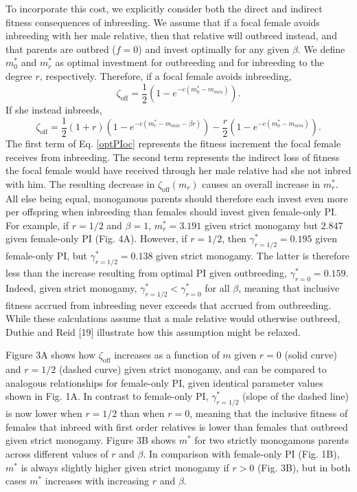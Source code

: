 \documentclass[12pt]{article}
\begin{document}
To incorporate this cost, we explicitly consider both the direct and indirect fitness consequences of inbreeding. We assume that if a focal female avoids inbreeding with her male relative, then that relative will outbreed instead, and that parents are outbred ($f=0$) and invest optimally for any given $\beta$. We define $m^{*}_{0}$ and $m^{*}_{r}$ as optimal investment for outbreeding and for inbreeding to the degree $r$, respectively. Therefore, if a focal female avoids inbreeding,
\begin{equation} \label{optPI}
\zeta_{\textrm{off}} = \frac{1}{2}\left(1-e^{-c\left(m^{*}_{0}-m_{min}\right)}\right).
\end{equation}
If she instead inbreeds,
\begin{equation} \label{optPIoc}
\zeta_{\textrm{off}} = \frac{1}{2}\left(1+r\right)\left(1-e^{-c\left(m^{*}_{r}-m_{min}-\beta r\right)}\right) - \frac{r}{2}\left(1-e^{-c\left(m^{*}_{0}-m_{min}\right)}\right).
\end{equation} 
The first term of Eq. \ref{optPIoc} represents the fitness increment the focal female receives from inbreeding. The second term represents the indirect loss of fitness the focal female would have received through her male relative had she not inbred with him. The resulting decrease in $\zeta_{\textrm{off}}(m_{r})$ causes an overall increase in $m^{*}_{r}$. All else being equal, monogamous parents should therefore each invest even more per offspring when inbreeding than females should invest given female-only PI. For example, if $r=1/2$ and $\beta=1$, $m^{*}_{r}= 3.191$ given strict monogamy but $2.847$ given female-only PI (Fig. 4A). However, if $r=1/2$, then $\gamma^{*}_{r=1/2}=0.195$ given female-only PI, but $\gamma^{*}_{r=1/2}=0.138$ given strict monogamy. The latter is therefore less than the increase resulting from optimal PI given outbreeding, $\gamma^{*}_{r=0}=0.159$. Indeed, given strict monogamy, $\gamma^{*}_{r=1/2} < \gamma^{*}_{r=0}$ for all $\beta$, meaning that inclusive fitness accrued from inbreeding never exceeds that accrued from outbreeding.  While these calculations assume that a male relative would otherwise outbreed, Duthie and Reid [19] illustrate how this assumption might be relaxed.

Figure 3A shows how $\zeta_{\textrm{off}}$ increases as a function of $m$ given $r=0$ (solid curve) and $r=1/2$ (dashed curve) given strict monogamy, and can be compared to analogous relationships for female-only PI, given identical parameter values shown in Fig. 1A. In contrast to female-only PI, $\gamma^{*}_{r=1/2}$ (slope of the dashed line) is now lower when $r=1/2$ than when $r=0$, meaning that the inclusive fitness of females that inbreed with first order relatives is lower than females that outbreed given strict monogamy. Figure 3B shows $m^{*}$ for two strictly monogamous parents across different values of $r$ and $\beta$. In comparison with female-only PI (Fig. 1B), $m^{*}$ is always slightly higher given strict monogamy if $r>0$ (Fig. 3B), but in both cases $m^{*}$ increases with increasing $r$ and $\beta$. 
\end{document}
